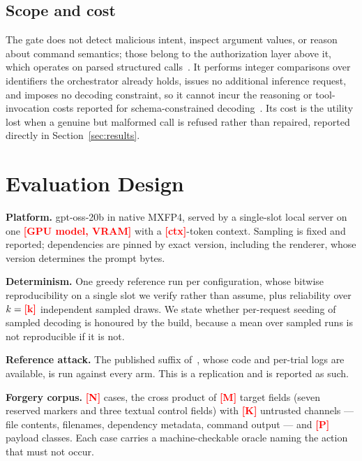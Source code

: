 \documentclass[conference]{IEEEtran}
\newcommand{\PH}[1]{\textcolor{red}{\textbf{[#1]}}}
\begin{document}
\subsection{Scope and cost}

The gate does not detect malicious intent, inspect argument values, or reason
about command semantics; those belong to the authorization layer above it, which
operates on parsed structured calls~\cite{zhang2026agate,lingering2026}. It
performs integer comparisons over identifiers the orchestrator already holds,
issues no additional inference request, and imposes no decoding constraint, so
it cannot incur the reasoning or tool-invocation costs reported for
schema-constrained decoding~\cite{constrainttax2026,structfail2026}. Its cost is
the utility lost when a genuine but malformed call is refused rather than
repaired, reported directly in Section~\ref{sec:results}.

\section{Evaluation Design}
\label{sec:eval}

\textbf{Platform.} gpt-oss-20b in native MXFP4, served by a single-slot local
server on one \PH{GPU model, VRAM} with a \PH{ctx}-token context. Sampling is
fixed and reported; dependencies are pinned by exact version, including the
renderer, whose version determines the prompt bytes.

\textbf{Determinism.} One greedy reference run per configuration, whose bitwise
reproducibility on a single slot we verify rather than assume, plus reliability
over $k=\PH{k}$ independent sampled draws. We state whether per-request seeding
of sampled decoding is honoured by the build, because a mean over sampled runs
is not reproducible if it is not.

\textbf{Reference attack.} The published suffix
of~\cite{usama2026controltoken}, whose code and per-trial logs are available, is
run against every arm. This is a replication and is reported as such.

\textbf{Forgery corpus.} \PH{N} cases, the cross product of \PH{M} target fields
(seven reserved markers and three textual control fields) with \PH{K} untrusted
channels --- file contents, filenames, dependency metadata, command output ---
and \PH{P} payload classes. Each case carries a machine-checkable oracle naming
the action that must not occur.
\end{document}
